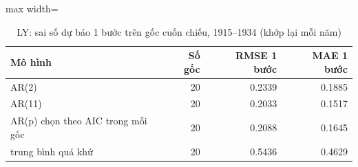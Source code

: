 \begin{table}[H]
\centering\footnotesize
\caption{LY: sai số dự báo 1 bước trên gốc cuốn chiếu, 1915--1934 (khớp lại mỗi năm)}\label{tab:tab_b11_13_ly_rolling}
\begin{adjustbox}{max width=\linewidth}
\begin{tabular}{|>{\raggedright\arraybackslash}p{}|r|r|r|}
\toprule
Mô hình & Số gốc & RMSE 1 bước & MAE 1 bước \\
\midrule
AR(2) & 20 & 0.2339 & 0.1885 \\[3pt]
AR(11) & 20 & 0.2033 & 0.1517 \\[3pt]
AR(p) chọn theo AIC trong mỗi gốc & 20 & 0.2088 & 0.1645 \\[3pt]
trung bình quá khứ & 20 & 0.5436 & 0.4629 \\[3pt]
\bottomrule
\end{tabular}
\end{adjustbox}\par{}
\end{table}
